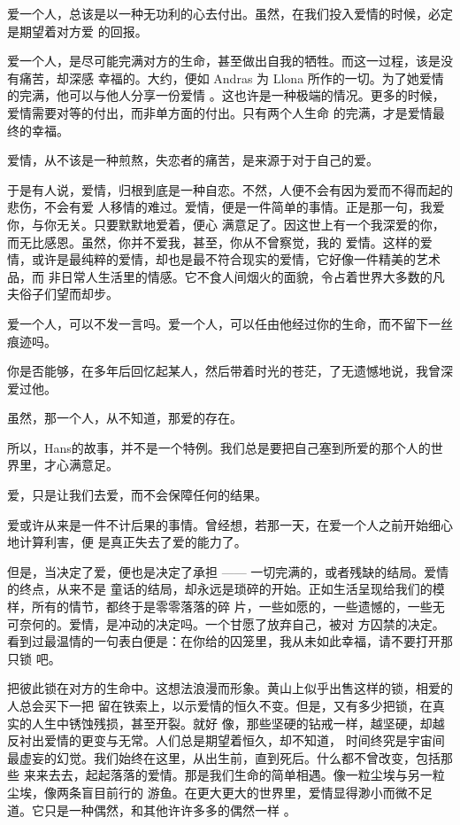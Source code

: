 \documentclass[12pt,a4paper]{article}
\begin{document}
		爱一个人，总该是以一种无功利的心去付出。虽然，在我们投入爱情的时候，必定是期望着对方爱
	的回报。

		爱一个人，是尽可能完满对方的生命，甚至做出自我的牺牲。而这一过程，该是没有痛苦，却深感
	幸福的。大约，便如 Andras 为 Llona 所作的一切。为了她爱情的完满，他可以与他人分享一份爱情
	。这也许是一种极端的情况。更多的时候，爱情需要对等的付出，而非单方面的付出。只有两个人生命
	的完满，才是爱情最终的幸福。

		爱情，从不该是一种煎熬，失恋者的痛苦，是来源于对于自己的爱。

		于是有人说，爱情，归根到底是一种自恋。不然，人便不会有因为爱而不得而起的悲伤，不会有爱
	人移情的难过。爱情，便是一件简单的事情。正是那一句，我爱你，与你无关。只要默默地爱着，便心
	满意足了。因这世上有一个我深爱的你，而无比感恩。虽然，你并不爱我，甚至，你从不曾察觉，我的
	爱情。这样的爱情，或许是最纯粹的爱情，却也是最不符合现实的爱情，它好像一件精美的艺术品，而
	非日常人生活里的情感。它不食人间烟火的面貌，令占着世界大多数的凡夫俗子们望而却步。

		爱一个人，可以不发一言吗。爱一个人，可以任由他经过你的生命，而不留下一丝痕迹吗。\par
		你是否能够，在多年后回忆起某人，然后带着时光的苍茫，了无遗憾地说，我曾深爱过他。\par
		虽然，那一个人，从不知道，那爱的存在。\par
		所以，Hans的故事，并不是一个特例。我们总是要把自己塞到所爱的那个人的世界里，才心满意足。

		爱，只是让我们去爱，而不会保障任何的结果。

		爱或许从来是一件不计后果的事情。曾经想，若那一天，在爱一个人之前开始细心地计算利害，便
	是真正失去了爱的能力了。

		但是，当决定了爱，便也是决定了承担 —— 一切完满的，或者残缺的结局。爱情的终点，从来不是
	童话的结局，却永远是琐碎的开始。正如生活呈现给我们的模样，所有的情节，都终于是零零落落的碎
	片，一些如愿的，一些遗憾的，一些无可奈何的。爱情，是冲动的决定吗。一个甘愿了放弃自己，被对
	方囚禁的决定。看到过最温情的一句表白便是：在你给的囚笼里，我从未如此幸福，请不要打开那只锁
	吧。

		把彼此锁在对方的生命中。这想法浪漫而形象。黄山上似乎出售这样的锁，相爱的人总会买下一把
	留在铁索上，以示爱情的恒久不变。但是，又有多少把锁，在真实的人生中锈蚀残损，甚至开裂。就好
	像，那些坚硬的钻戒一样，越坚硬，却越反衬出爱情的更变与无常。人们总是期望着恒久，却不知道，
	时间终究是宇宙间最虚妄的幻觉。我们始终在这里，从出生前，直到死后。什么都不曾改变，包括那些
	来来去去，起起落落的爱情。那是我们生命的简单相遇。像一粒尘埃与另一粒尘埃，像两条盲目前行的
	游鱼。在更大更大的世界里，爱情显得渺小而微不足道。它只是一种偶然，和其他许许多多的偶然一样
	。
\end{document}
